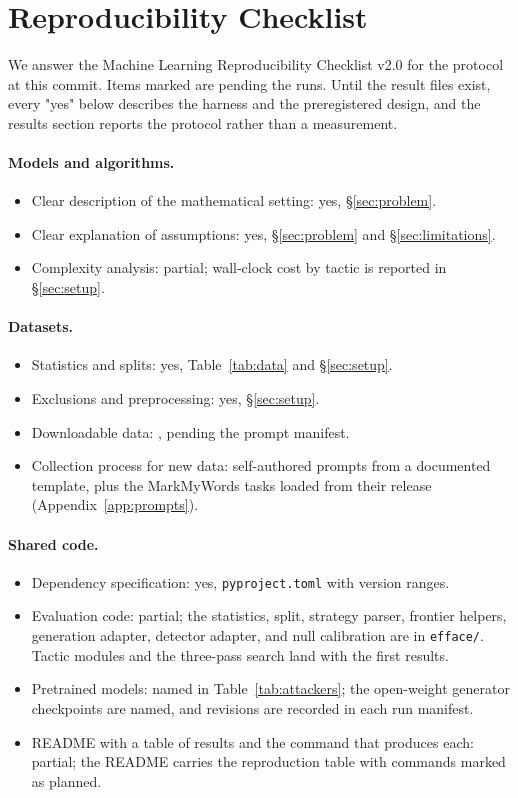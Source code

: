 \section{Reproducibility Checklist}
\label{app:checklist}

We answer the Machine Learning Reproducibility Checklist v2.0 \citep{pineau} for the protocol at this commit. Items marked  are pending the runs. Until the result files exist, every "yes" below describes the harness and the preregistered design, and the results section reports the protocol rather than a measurement.

\paragraph{Models and algorithms.}
\begin{itemize}
  \item Clear description of the mathematical setting: yes, \S\ref{sec:problem}.
  \item Clear explanation of assumptions: yes, \S\ref{sec:problem} and \S\ref{sec:limitations}.
  \item Complexity analysis: partial; wall-clock cost by tactic is reported in \S\ref{sec:setup}.
\end{itemize}

\paragraph{Datasets.}
\begin{itemize}
  \item Statistics and splits: yes, Table~\ref{tab:data} and \S\ref{sec:setup}.
  \item Exclusions and preprocessing: yes, \S\ref{sec:setup}.
  \item Downloadable data: , pending the prompt manifest.
  \item Collection process for new data: self-authored prompts from a documented template, plus the MarkMyWords tasks loaded from their release (Appendix~\ref{app:prompts}).
\end{itemize}

\paragraph{Shared code.}
\begin{itemize}
  \item Dependency specification: yes, \texttt{pyproject.toml} with version ranges.
  \item Evaluation code: partial; the statistics, split, strategy parser, frontier helpers, generation adapter, detector adapter, and null calibration are in \texttt{efface/}. Tactic modules and the three-pass search land with the first results.
  \item Pretrained models: named in Table~\ref{tab:attackers}; the open-weight generator checkpoints are named, and revisions are recorded in each run manifest.
  \item README with a table of results and the command that produces each: partial; the README carries the reproduction table with commands marked as planned.
\end{itemize}

